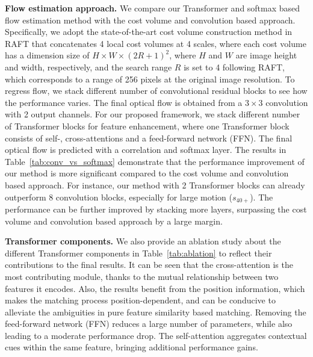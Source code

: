 \documentclass[10pt,twocolumn,letterpaper]{article}
\begin{document}
{\bf Flow estimation approach.} We compare our Transformer and softmax based flow estimation method with the cost volume and convolution based approach. Specifically, we adopt the state-of-the-art cost volume construction method in RAFT \cite{teed2020raft} that concatenates 4 local cost volumes at 4 scales, where each cost volume has a dimension size of $H \times W \times (2R+1)^2$, where $H$ and $W$ are image height and width, respectively, and the search range $R$ is set to 4 following RAFT, which corresponds to a range of 256 pixels at the original image resolution. To regress flow, we stack different number of convolutional residual blocks \cite{he2016deep} to see how the performance varies. The final optical flow is obtained from a $3 \times 3$ convolution with 2 output channels. For our proposed framework, we stack different number of Transformer blocks for feature enhancement, where one Transformer block consists of self-, cross-attentions and a feed-forward network (FFN). The final optical flow is predicted with a correlation and softmax layer. The results in Table~\ref{tab:conv_vs_softmax} demonstrate that the performance improvement of our method is more significant compared to the cost volume and convolution based approach. For instance, our method with 2 Transformer blocks can already outperform 8 convolution blocks, especially for large motion ($s_{40+}$). The performance can be further improved by stacking more layers, surpassing the cost volume and convolution based approach by a large margin.




{\bf Transformer components.} We also provide an ablation study about the different Transformer components in Table~\ref{tab:ablation} to reflect their contributions to the final results. It can be seen that the cross-attention is the most contributing module, thanks to the mutual relationship between two features it encodes. Also, the results benefit from the position information, which makes the matching process position-dependent, and can be conducive to alleviate the ambiguities in pure feature similarity based matching. Removing the feed-forward network (FFN) reduces a large number of parameters, while also leading to a moderate performance drop. The self-attention aggregates contextual cues within the same feature, bringing additional performance gains.
\end{document}
